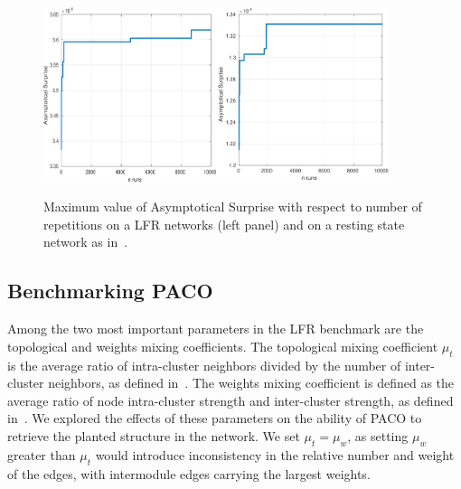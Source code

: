 \noindent\begin{figure}[htb!]
\centering
\includegraphics[width=0.45\textwidth]{images/paco_variability_nreps_lfr.png}\includegraphics[width=0.45\textwidth]{images/paco_variability_nreps_bullmore.png}
\caption{Maximum value of Asymptotical Surprise with respect to number of repetitions on a LFR networks (left panel) and on a resting state network as in~\cite{crossley2013}.}
\label{fig:paco_variability}
\end{figure}

\subsection{Benchmarking PACO}
Among the two most important parameters in the LFR benchmark are the topological and weights mixing coefficients. 
The topological mixing coefficient $\mu_t$ is the average ratio of intra-cluster neighbors divided by the number of inter-cluster neighbors, as defined in~\cite{lancichinetti2008}. The weights mixing coefficient is defined as the average ratio of node intra-cluster strength and inter-cluster strength, as defined in~\cite{lancichinetti2009a}.
We explored the effects of these parameters on the ability of PACO to retrieve the planted structure in the network.
We set $\mu_t=\mu_w$, as setting $\mu_w$ greater than $\mu_t$ would introduce inconsistency in the relative number and weight of the edges, with intermodule edges carrying the largest weights.

